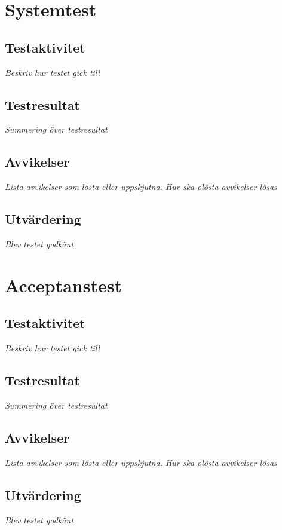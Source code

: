 \documentclass[a4paper,10pt]{article}
\begin{document}
\section{Systemtest}
\subsection{Testaktivitet}
\emph{Beskriv hur testet gick till}
\subsection{Testresultat}
\emph{Summering över testresultat}
\subsection{Avvikelser}
\emph{Lista avvikelser som lösta eller uppskjutna. Hur ska olösta avvikelser lösas}
\subsection{Utvärdering}
\emph{Blev testet godkänt}
\section{Acceptanstest}
\subsection{Testaktivitet}
\emph{Beskriv hur testet gick till}
\subsection{Testresultat}
\emph{Summering över testresultat}
\subsection{Avvikelser}
\emph{Lista avvikelser som lösta eller uppskjutna. Hur ska olösta avvikelser lösas}
\subsection{Utvärdering}
\emph{Blev testet godkänt}
\end{document}
